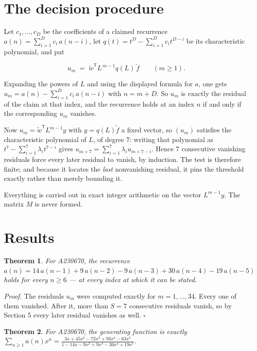 \documentclass[11pt]{article}
\newtheorem{theorem}{Theorem}
\theoremstyle{definition}
\begin{document}
\section{The decision procedure}

Let $c_1,\dots,c_D$ be the coefficients of a claimed recurrence $a(n) = \sum_{i=1}^{D} c_i\,a(n-i)$, let $q(t) = t^{D} - \sum_{i=1}^{D} c_i t^{D-i}$ be its characteristic polynomial, and put

\[u_m \;=\; \tilde w^{\mathsf T} L^{\,m-1} q(L)\,\tilde f \qquad (m \ge 1).\]

Expanding the powers of $L$ and using the displayed formula for $a$, one gets $u_m = a(n) - \sum_{i=1}^{D} c_i\,a(n-i)$ with $n = m + D$. So $u_m$ is exactly the residual of the claim at that index, and the recurrence holds at an index $n$ if and only if the corresponding $u_m$ vanishes.

Now $u_m = \tilde w^{\mathsf T} L^{m-1} y$ with $y = q(L)\tilde f$ a fixed vector, so $(u_m)$ satisfies the characteristic polynomial of $L$, of degree $7$: writing that polynomial as $t^{7} - \sum_{i=1}^{7} \lambda_i t^{7-i}$ gives $u_{m+7} = \sum_{i=1}^{7} \lambda_i u_{m+7-i}$. Hence $7$ consecutive vanishing residuals force every later residual to vanish, by induction. The test is therefore finite; and because it locates the {\itshape last} nonvanishing residual, it pins the threshold exactly rather than merely bounding it.

Everything is carried out in exact integer arithmetic on the vector $L^{m-1}y$. The matrix $M$ is never formed.

\section{Results}

\begin{theorem} For A230670, the recurrence $a(n) = 14\,a(n-1) + 9\,a(n-2) - 9\,a(n-3) + 30\,a(n-4) - 19\,a(n-5)$ holds for every $n \ge 6$ --- at every index at which it can be stated.\end{theorem}

{\itshape Proof.} The residuals $u_m$ were computed exactly for $m = 1,\dots,34$. Every one of them vanished. After it, more than $S = 7$ consecutive residuals vanish, so by Section 5 every later residual vanishes as well. $\square$

\begin{theorem} For A230670, the generating function is exactly $\sum_{n\ge 1} a(n)x^n = \frac{3x + 45x^{2} - 72x^{3} + 93x^{4} - 63x^{5}}{1 - 14x - 9x^{2} + 9x^{3} - 30x^{4} + 19x^{5}}$.\end{theorem}
\end{document}
